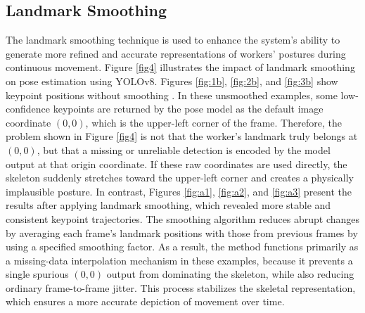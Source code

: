 \documentclass[11pt]{article}
\begin{document}

\subsection{Landmark Smoothing}

The landmark smoothing technique is used to enhance the system's ability to generate more refined and accurate representations of workers' postures during continuous movement. Figure \ref{fig4} illustrates the impact of landmark smoothing on pose estimation using YOLOv8. Figures \ref{fig:1b}, \ref{fig:2b}, and \ref{fig:3b} show keypoint positions without smoothing  . In these unsmoothed examples, some low-confidence keypoints are returned by the pose model as the default image coordinate \((0,0)\), which is the upper-left corner of the frame. Therefore, the problem shown in Figure \ref{fig4} is not that the worker's landmark truly belongs at \((0,0)\), but that a missing or unreliable detection is encoded by the model output at that origin coordinate. If these raw coordinates are used directly, the skeleton suddenly stretches toward the upper-left corner and creates a physically implausible posture.  In contrast, Figures \ref{fig:a1}, \ref{fig:a2}, and \ref{fig:a3} present the results after applying landmark smoothing, which revealed more stable and consistent keypoint trajectories. The smoothing algorithm reduces abrupt changes by averaging each frame's landmark positions with those from previous frames by using a specified smoothing factor.  As a result, the method functions primarily as a missing-data interpolation mechanism in these examples, because it prevents a single spurious \((0,0)\) output from dominating the skeleton, while also reducing ordinary frame-to-frame jitter.  This process stabilizes the skeletal representation, which ensures a more accurate depiction of movement over time.
\end{document}
